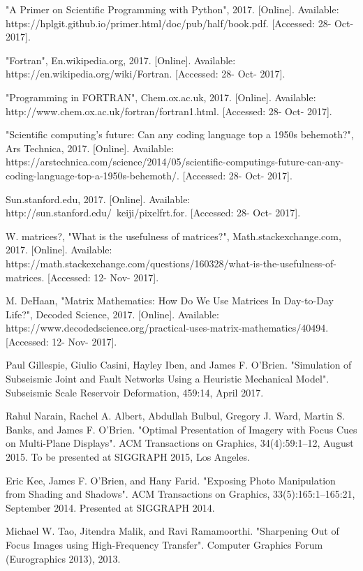 \documentclass[conference]{IEEEtran}
\begin{document}
\begin{thebibliography}{00}
 "A Primer on Scientific Programming with Python", 2017. [Online]. Available: https://hplgit.github.io/primer.html/doc/pub/half/book.pdf. [Accessed: 28- Oct- 2017].

 "Fortran", En.wikipedia.org, 2017. [Online]. Available: https://en.wikipedia.org/wiki/Fortran. [Accessed: 28- Oct- 2017].

 "Programming in FORTRAN", Chem.ox.ac.uk, 2017. [Online]. Available: http://www.chem.ox.ac.uk/fortran/fortran1.html. [Accessed: 28- Oct- 2017].

 "Scientific computing’s future: Can any coding language top a 1950s behemoth?", Ars Technica, 2017. [Online]. Available: https://arstechnica.com/science/2014/05/scientific-computings-future-can-any-coding-language-top-a-1950s-behemoth/. [Accessed: 28- Oct- 2017].

 Sun.stanford.edu, 2017. [Online]. Available: http://sun.stanford.edu/~keiji/pixelfrt.for. [Accessed: 28- Oct- 2017].

 W. matrices?, "What is the usefulness of matrices?", Math.stackexchange.com, 2017. [Online]. Available: https://math.stackexchange.com/questions/160328/what-is-the-usefulness-of-matrices. [Accessed: 12- Nov- 2017].

 M. DeHaan, "Matrix Mathematics: How Do We Use Matrices In Day-to-Day Life?", Decoded Science, 2017. [Online]. Available: https://www.decodedscience.org/practical-uses-matrix-mathematics/40494. [Accessed: 12- Nov- 2017].

 Paul Gillespie, Giulio Casini, Hayley Iben, and James F. O'Brien. "Simulation of Subseismic Joint and Fault Networks Using a Heuristic Mechanical Model". Subseismic Scale Reservoir Deformation, 459:14, April 2017.

 Rahul Narain, Rachel A. Albert, Abdullah Bulbul, Gregory J. Ward, Martin S. Banks, and James F. O'Brien. "Optimal Presentation of Imagery with Focus Cues on Multi-Plane Displays". ACM Transactions on Graphics, 34(4):59:1–12, August 2015. To be presented at SIGGRAPH 2015, Los Angeles.

 Eric Kee, James F. O'Brien, and Hany Farid. "Exposing Photo Manipulation from Shading and Shadows". ACM Transactions on Graphics, 33(5):165:1–165:21, September 2014. Presented at SIGGRAPH 2014.

 Michael W. Tao, Jitendra Malik, and Ravi Ramamoorthi. "Sharpening Out of Focus Images using High-Frequency Transfer". Computer Graphics Forum (Eurographics 2013), 2013.

\end{thebibliography}
\end{document}
